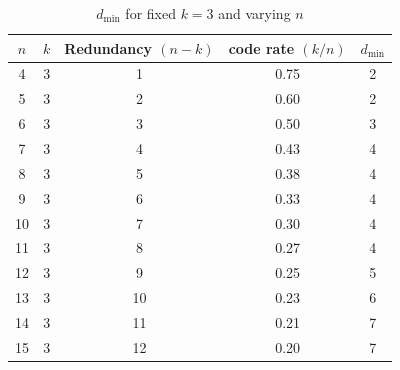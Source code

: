 \documentclass{article}
\begin{document}
\begin{table}[ht]
  \centering
  \begin{tabular}{ccccc}
    \hline
    \(n\)  &  \(k\)  &  Redundancy \((n - k)\)  & code rate \((k/n)\) & \(d_\text{min}\)\\
    \hline
         4  &  3  &   1  &  0.75  &  2 \\
         5  &  3  &   2  &  0.60  &  2 \\
         6  &  3  &   3  &  0.50  &  3 \\
         7  &  3  &   4  &  0.43  &  4 \\
         8  &  3  &   5  &  0.38  &  4 \\
         9  &  3  &   6  &  0.33  &  4 \\
        10  &  3  &   7  &  0.30  &  4 \\
        11  &  3  &   8  &  0.27  &  4 \\
        12  &  3  &   9  &  0.25  &  5 \\
        13  &  3  &  10  &  0.23  &  6 \\
        14  &  3  &  11  &  0.21  &  7 \\
        15  &  3  &  12  &  0.20  &  7 \\
    \hline
  \end{tabular}
  \caption{\(d_\text{min}\) for fixed \(k = 3\) and varying \(n\) \parencite{jaish2026}}
  \label{tab:fixed_k}
\end{table}
\end{document}
